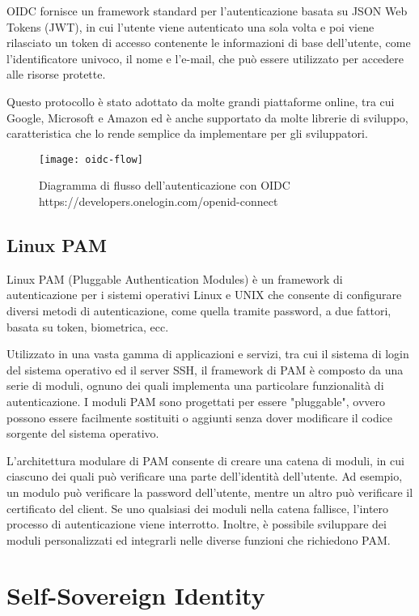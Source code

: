 OIDC fornisce un framework standard per l'autenticazione basata su JSON Web Tokens (JWT), in cui l'utente viene autenticato una sola volta e poi viene rilasciato un token di accesso contenente le informazioni di base dell'utente, come l'identificatore univoco, il nome e l'e-mail, che può essere utilizzato per accedere alle risorse protette.

Questo protocollo è stato adottato da molte grandi piattaforme online, tra cui Google, Microsoft e Amazon ed è anche supportato da molte librerie di sviluppo, caratteristica che lo rende semplice da implementare per gli sviluppatori.

\begin{figure}[!h] 
    \centering 
    \texttt{[image: oidc-flow]} 
    \caption{Diagramma di flusso dell'autenticazione con OIDC
    https://developers.onelogin.com/openid-connect}
\end{figure}

\subsection{Linux PAM}
Linux PAM (Pluggable Authentication Modules) è un framework di autenticazione per i sistemi operativi Linux e UNIX che consente di configurare diversi metodi di autenticazione, come quella tramite password, a due fattori, basata su token, biometrica, ecc.

Utilizzato in una vasta gamma di applicazioni e servizi, tra cui il sistema di login del sistema operativo ed il server SSH, il framework di PAM è composto da una serie di moduli, ognuno dei quali implementa una particolare funzionalità di autenticazione. I moduli PAM sono progettati per essere "pluggable", ovvero possono essere facilmente sostituiti o aggiunti senza dover modificare il codice sorgente del sistema operativo.

L'architettura modulare di PAM consente di creare una catena di moduli, in cui ciascuno dei quali può verificare una parte dell'identità dell'utente. Ad esempio, un modulo può verificare la password dell'utente, mentre un altro può verificare il certificato del client. Se uno qualsiasi dei moduli nella catena fallisce, l'intero processo di autenticazione viene interrotto. Inoltre, è possibile sviluppare dei moduli personalizzati ed integrarli nelle diverse funzioni che richiedono PAM.

\section{Self-Sovereign Identity}

